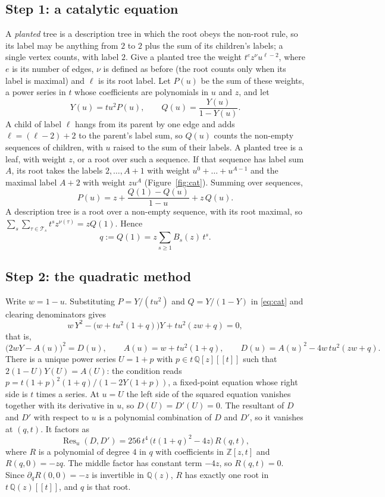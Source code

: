 \documentclass[11pt]{amsart}
\theoremstyle{remark}
\DeclareMathOperator{\Res}{Res}
\begin{document}
\subsection*{Step 1: a catalytic equation}
A \emph{planted} tree is a description tree in which the root obeys the non-root rule, so its label may be anything
from $2$ to $2$ plus the sum of its children's labels; a single vertex counts, with label $2$. Give a planted tree
the weight $t^{e}z^{\nu}u^{\ell-2}$, where $e$ is its number of edges, $\nu$ is defined as before (the root counts
only when its label is maximal) and $\ell$ is its root label. Let $P(u)$ be the sum of these weights, a power series
in $t$ whose coefficients are polynomials in $u$ and $z$, and let
\[
  Y(u) = t u^2 P(u), \qquad Q(u) = \frac{Y(u)}{1-Y(u)}.
\]
A child of label $\ell$ hangs from its parent by one edge and adds $\ell = (\ell-2)+2$ to the parent's label sum, so
$Q(u)$ counts the non-empty sequences of children, with $u$ raised to the sum of their labels. A planted tree is a
leaf, with weight $z$, or a root over such a sequence. If that sequence has label sum $A$, its root takes the labels
$2, \dots, A+1$ with weight $u^{0} + \dots + u^{A-1}$ and the maximal label $A+2$ with weight $zu^{A}$
(Figure~\ref{fig:cat}). Summing over sequences,
\begin{equation}\label{eq:cat}
  P(u) = z + \frac{Q(1)-Q(u)}{1-u} + z\,Q(u).
\end{equation}
A description tree is a root over a non-empty sequence, with its root maximal, so
$\sum_{s}\sum_{\tau\in\mathcal T_s} t^s z^{\nu(\tau)} = zQ(1)$. Hence
\[
  q := Q(1) = z\sum_{s \ge 1} B_s(z)\,t^s .
\]

\subsection*{Step 2: the quadratic method}
Write $w = 1-u$. Substituting $P = Y/(tu^2)$ and $Q = Y/(1-Y)$ in \eqref{eq:cat} and clearing denominators gives
\[
  w\,Y^2 - \bigl(w + tu^2(1+q)\bigr)Y + tu^2(zw+q) = 0 ,
\]
that is,
\[
  \bigl(2wY - A(u)\bigr)^2 = D(u), \qquad A(u) = w + tu^2(1+q), \qquad D(u) = A(u)^2 - 4w\,tu^2(zw + q).
\]
There is a unique power series $U = 1+p$ with $p \in t\,\mathbb Q[z][[t]]$ such that $2(1-U)Y(U) = A(U)$: the
condition reads $p = t(1+p)^2(1+q)/(1 - 2Y(1+p))$, a fixed-point equation whose right side is $t$ times a series.
At $u = U$ the left side of the squared equation vanishes together with its derivative in $u$, so $D(U) = D'(U) = 0$.
The resultant of $D$ and $D'$ with respect to $u$ is a polynomial combination of $D$ and $D'$, so it vanishes at
$(q,t)$. It factors as
\[
  \Res_u(D, D') = 256\,t^4\,\bigl(t(1+q)^2 - 4z\bigr)\,R(q,t),
\]
where $R$ is a polynomial of degree $4$ in $q$ with coefficients in $\mathbb Z[z,t]$ and $R(q,0) = -zq$. The middle
factor has constant term $-4z$, so $R(q,t) = 0$. Since $\partial_q R(0,0) = -z$ is invertible in $\mathbb Q(z)$,
$R$ has exactly one root in $t\,\mathbb Q(z)[[t]]$, and $q$ is that root.
\end{document}
